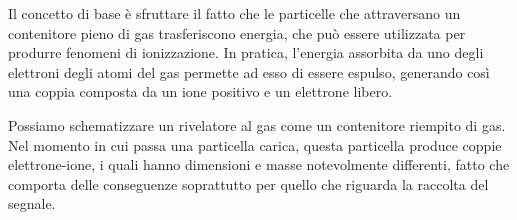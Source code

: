 Il concetto di base è sfruttare il fatto che le particelle che attraversano un contenitore pieno di gas trasferiscono energia, che può essere utilizzata per produrre fenomeni di ionizzazione. In pratica, l'energia assorbita da uno degli elettroni degli atomi del gas permette ad esso di essere espulso, generando così una coppia composta da un ione positivo e un elettrone libero.

\begin{minipage}{0.395\textwidth}
   \begin{figure}[H]
      \centering
   \end{figure}
\end{minipage}
\begin{minipage}{0.6\textwidth}
   \vspace{0.5cm}Possiamo schematizzare un rivelatore al gas come un contenitore riempito di gas. Nel momento in cui passa una particella carica, questa particella produce coppie elettrone-ione, i quali hanno dimensioni e masse notevolmente differenti, fatto che comporta delle conseguenze soprattutto per quello che riguarda la raccolta del segnale. 
\end{minipage}

